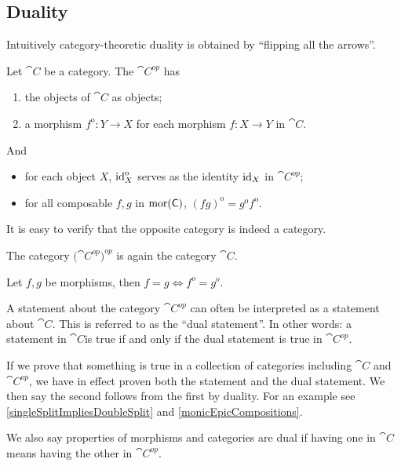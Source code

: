 \subsection{Duality}
Intuitively category-theoretic duality is obtained by ``flipping all the arrows''.
\begin{definition}
Let $\cat{C}$ be a category. The  $\cat{C^{op}}$ has
\begin{enumerate}
\item the objects of $\cat{C}$ as objects;
\item a morphism $f^\text{o}: Y\to X$ for each morphism $f:X\to Y$ in $\cat{C}$.
\end{enumerate}
And
\begin{itemize}
\item for each object $X$, $\operatorname{id}_X^\text{o}$ serves as the identity $\operatorname{id}_X$ in $\cat{C^{op}}$;
\item for all composable $f,g$ in $\operatorname{mor}(\mathsf{C})$, $(fg)^\text{o} = g^\text{o}f^\text{o}$.
\end{itemize}
\end{definition}
It is easy to verify that the opposite category is indeed a category.

\begin{lemma}
The category $(\cat{C^{op})^{op}}$ is again the category $\cat{C}$.
\end{lemma}

\begin{lemma}
Let $f,g$ be morphisms, then $f = g \iff f^o = g^o$.
\end{lemma}

A statement about the category $\cat{C^{op}}$ can often be interpreted as a statement about $\cat{C}$. This is referred to as the ``dual statement''. In other words: a statement in $\cat{C}$is true if and only if the dual statement is true in $\cat{C^{op}}$.

If we prove that something is true in a collection of categories including $\cat{C}$ and $\cat{C^{op}}$, we have in effect proven both the statement and the dual statement. We then say the second follows from the first by duality. For an example see \ref{singleSplitImpliesDoubleSplit} and \ref{monicEpicCompositions}.

We also say properties of morphisms and categories are dual if having one in $\cat{C}$ means having the other in $\cat{C^{op}}$.

